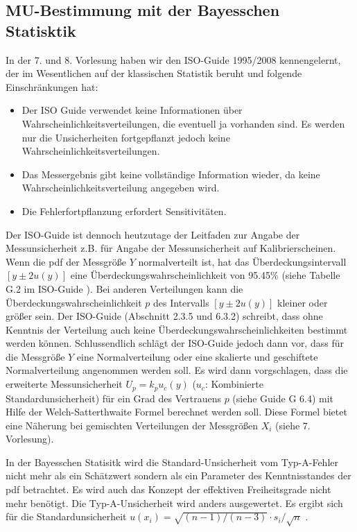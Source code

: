 \subsection{MU-Bestimmung mit der Bayesschen Statisktik}
In der 7. und 8. Vorlesung haben wir den ISO-Guide 1995/2008 \cite{GUM95} kennengelernt, der im Wesentlichen auf der klassischen Statistik beruht und 
folgende Einschränkungen hat: 
\begin{itemize}\item Der ISO Guide verwendet keine Informationen über 
	Wahrscheinlichkeitsverteilungen, die eventuell ja vorhanden
	sind. Es werden nur die Unsicherheiten fortgepflanzt jedoch keine Wahrscheinlichkeitsverteilungen.
	\item Das Messergebnis gibt keine vollständige Information wieder, da keine Wahrscheinlichkeitsverteilung angegeben wird.
	\item Die Fehlerfortpflanzung erfordert Sensitivitäten.
\end{itemize}
Der ISO-Guide ist dennoch heutzutage der Leitfaden zur Angabe der 
Messunsicherheit z.B. für Angabe der Messunsicherheit auf Kalibrierscheinen.
Wenn die pdf der Messgröße $Y$ normalverteilt ist, hat das Überdeckungsintervall
$[y\pm 2 u(y)]$ eine Überdeckungswahrscheinlichkeit von 95.45\% (siehe Tabelle G.2 im ISO-Guide \cite{GUM95}).
Bei anderen Verteilungen kann die Überdeckungswahrscheinlichkeit $p$ des Intervalls $[y \pm 2 u(y)]$ kleiner oder 
größer sein. Der ISO-Guide (Abschnitt 2.3.5 und 6.3.2) schreibt, dass ohne 
Kenntnis der Verteilung auch keine Überdeckungswahrscheinlichkeiten bestimmt werden können. Schlussendlich schlägt der ISO-Guide jedoch dann vor, dass für die 
Messgröße $Y$ eine Normalverteilung oder eine skalierte und 
geschiftete Normalverteilung angenommen werden soll.
Es wird dann vorgschlagen, dass die erweiterte Messunsicherheit 
$U_p=k_p u_c(y)$ ($u_c$: Kombinierte Standardunsicherheit) für ein Grad des Vertrauens $p$ (siehe Guide G 6.4) mit 
Hilfe der Welch-Satterthwaite Formel berechnet werden soll. Diese Formel
bietet eine Näherung bei gemischten Verteilungen der Messgrößen $X_i$
(siehe 7. Vorlesung).

In der Bayesschen Statisitk wird die Standard-Unsicherheit vom Typ-A-Fehler nicht mehr als ein Schätzwert sondern als ein Parameter des Kenntnisstandes der pdf betrachtet.
Es wird auch das Konzept der effektiven Freiheitsgrade nicht mehr benötigt.
Die Typ-A-Unsicherheit wird anders ausgewertet. Es ergibt sich für die Standardunsicherheit $u(x_i) = \sqrt{(n-1)/(n-3)} \cdot s_i/\sqrt{n}$ \cite{Kac03}. 



